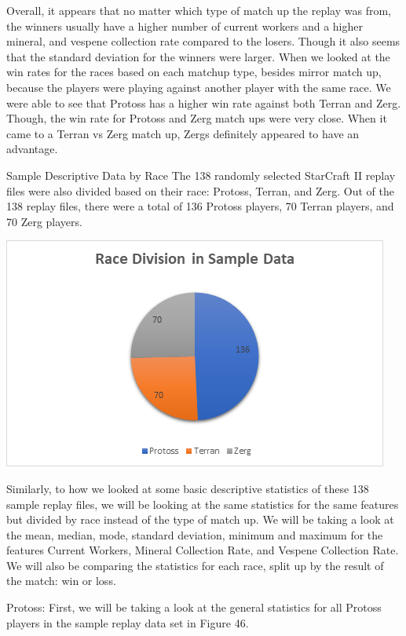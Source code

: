 \documentclass[a4paper,12pt]{report}
\begin{document}
Overall, it appears that no matter which type of match up the replay was from, the winners usually have a higher number of current workers and a higher mineral, and vespene collection rate compared to the losers. Though it also seems that the standard deviation for the winners were larger. When we looked at the win rates for the races based on each matchup type, besides mirror match up, because the players were playing against another player with the same race. We were able to see that Protoss has a higher win rate against both Terran and Zerg. Though, the win rate for Protoss and Zerg match ups were very close. When it came to a Terran vs Zerg match up, Zergs definitely appeared to have an advantage. 

Sample Descriptive Data by Race
The 138 randomly selected StarCraft II replay files were also divided based on their race: Protoss, Terran, and Zerg. Out of the 138 replay files, there were a total of 136 Protoss players, 70 Terran players, and 70 Zerg players. 

\begin{center}
    \captionsetup{type=figure}
    \includegraphics[width=.9\linewidth]{media/RaceDivision.png}
\end{center}

Similarly, to how we looked at some basic descriptive statistics of these 138 sample replay files, we will be looking at the same statistics for the same features but divided by race instead of the type of match up. We will be taking a look at the mean, median, mode, standard deviation, minimum and maximum for the features Current Workers, Mineral Collection Rate, and Vespene Collection Rate. We will also be comparing the statistics for each race, split up by the result of the match: win or loss. 

Protoss:
First, we will be taking a look at the general statistics for all Protoss players in the sample replay data set in Figure 46. 
\end{document}
